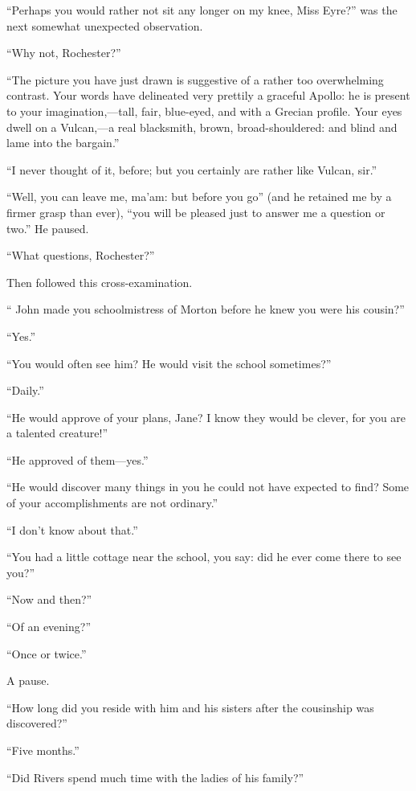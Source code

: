\enquote{Perhaps you would rather not sit any longer on my knee, Miss
Eyre?} was the next somewhat unexpected observation.

\enquote{Why not, \Mr{} Rochester?}

\enquote{The picture you have just drawn is suggestive of a rather too
overwhelming contrast. Your words have delineated very prettily a
graceful Apollo: he is present to your imagination,---tall, fair,
blue-eyed, and with a Grecian profile. Your eyes dwell on a Vulcan,---a
real blacksmith, brown, broad-shouldered: and blind and lame into the
bargain.}

\enquote{I never thought of it, before; but you certainly are rather
like Vulcan, sir.}

\enquote{Well, you can leave me, ma'am: but before you go} (and he
retained me by a firmer grasp than ever), \enquote{you will be pleased
just to answer me a question or two.} He paused.

\enquote{What questions, \Mr{} Rochester?}

Then followed this cross-examination.

\enquote{\St{} John made you schoolmistress of Morton before he knew you
were his cousin?}

\enquote{Yes.}

\enquote{You would often see him? He would visit the school sometimes?}

\enquote{Daily.}

\enquote{He would approve of your plans, Jane? I know they would be
clever, for you are a talented creature!}

\enquote{He approved of them---yes.}

\enquote{He would discover many things in you he could not have expected
to find? Some of your accomplishments are not ordinary.}

\enquote{I don't know about that.}

\enquote{You had a little cottage near the school, you say: did he ever
come there to see you?}

\enquote{Now and then?}

\enquote{Of an evening?}

\enquote{Once or twice.}

A pause.

\enquote{How long did you reside with him and his sisters after the
cousinship was discovered?}

\enquote{Five months.}

\enquote{Did Rivers spend much time with the ladies of his family?}

